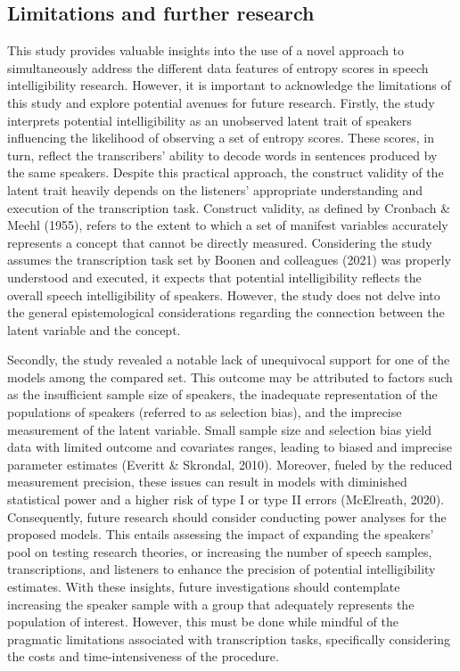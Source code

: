 \documentclass[
]{agujournal2019}
\begin{document}
\subsection{Limitations and further research}\label{sec-D-LFR}

This study provides valuable insights into the use of a novel approach
to simultaneously address the different data features of entropy scores
in speech intelligibility research. However, it is important to
acknowledge the limitations of this study and explore potential avenues
for future research. Firstly, the study interprets potential
intelligibility as an unobserved latent trait of speakers influencing
the likelihood of observing a set of entropy scores. These scores, in
turn, reflect the transcribers' ability to decode words in sentences
produced by the same speakers. Despite this practical approach, the
construct validity of the latent trait heavily depends on the listeners'
appropriate understanding and execution of the transcription task.
Construct validity, as defined by Cronbach \& Meehl (1955), refers to
the extent to which a set of manifest variables accurately represents a
concept that cannot be directly measured. Considering the study assumes
the transcription task set by Boonen and colleagues (2021) was properly
understood and executed, it expects that potential intelligibility
reflects the overall speech intelligibility of speakers. However, the
study does not delve into the general epistemological considerations
regarding the connection between the latent variable and the concept.

Secondly, the study revealed a notable lack of unequivocal support for
one of the models among the compared set. This outcome may be attributed
to factors such as the insufficient sample size of speakers, the
inadequate representation of the populations of speakers (referred to as
selection bias), and the imprecise measurement of the latent variable.
Small sample size and selection bias yield data with limited outcome and
covariates ranges, leading to biased and imprecise parameter estimates
(Everitt \& Skrondal, 2010). Moreover, fueled by the reduced measurement
precision, these issues can result in models with diminished statistical
power and a higher risk of type I or type II errors (McElreath, 2020).
Consequently, future research should consider conducting power analyses
for the proposed models. This entails assessing the impact of expanding
the speakers' pool on testing research theories, or increasing the
number of speech samples, transcriptions, and listeners to enhance the
precision of potential intelligibility estimates. With these insights,
future investigations should contemplate increasing the speaker sample
with a group that adequately represents the population of interest.
However, this must be done while mindful of the pragmatic limitations
associated with transcription tasks, specifically considering the costs
and time-intensiveness of the procedure.
\end{document}
